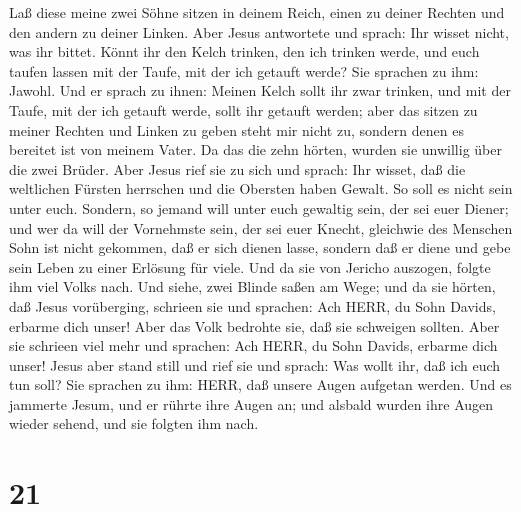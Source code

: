 Laß diese meine zwei Söhne sitzen in deinem Reich, einen zu deiner
Rechten und den andern zu deiner Linken.  Aber Jesus
antwortete und sprach: Ihr wisset nicht, was ihr bittet. Könnt ihr den
Kelch trinken, den ich trinken werde, und euch taufen lassen mit der
Taufe, mit der ich getauft werde? Sie sprachen zu ihm: Jawohl.
 Und er sprach zu ihnen: Meinen Kelch sollt ihr zwar
trinken, und mit der Taufe, mit der ich getauft werde, sollt ihr getauft
werden; aber das sitzen zu meiner Rechten und Linken zu geben steht mir
nicht zu, sondern denen es bereitet ist von meinem Vater. 
Da das die zehn hörten, wurden sie unwillig über die zwei Brüder.
 Aber Jesus rief sie zu sich und sprach: Ihr wisset, daß
die weltlichen Fürsten herrschen und die Obersten haben Gewalt.
 So soll es nicht sein unter euch. Sondern, so jemand will
unter euch gewaltig sein, der sei euer Diener;  und wer da
will der Vornehmste sein, der sei euer Knecht,  gleichwie
des Menschen Sohn ist nicht gekommen, daß er sich dienen lasse, sondern
daß er diene und gebe sein Leben zu einer Erlösung für viele.
 Und da sie von Jericho auszogen, folgte ihm viel Volks
nach.  Und siehe, zwei Blinde saßen am Wege; und da sie
hörten, daß Jesus vorüberging, schrieen sie und sprachen: Ach HERR, du
Sohn Davids, erbarme dich unser!  Aber das Volk bedrohte
sie, daß sie schweigen sollten. Aber sie schrieen viel mehr und
sprachen: Ach HERR, du Sohn Davids, erbarme dich unser! 
Jesus aber stand still und rief sie und sprach: Was wollt ihr, daß ich
euch tun soll?  Sie sprachen zu ihm: HERR, daß unsere Augen
aufgetan werden.  Und es jammerte Jesum, und er rührte ihre
Augen an; und alsbald wurden ihre Augen wieder sehend, und sie folgten
ihm nach.

\hypertarget{section-20}{%
\section{21}\label{section-20}}

